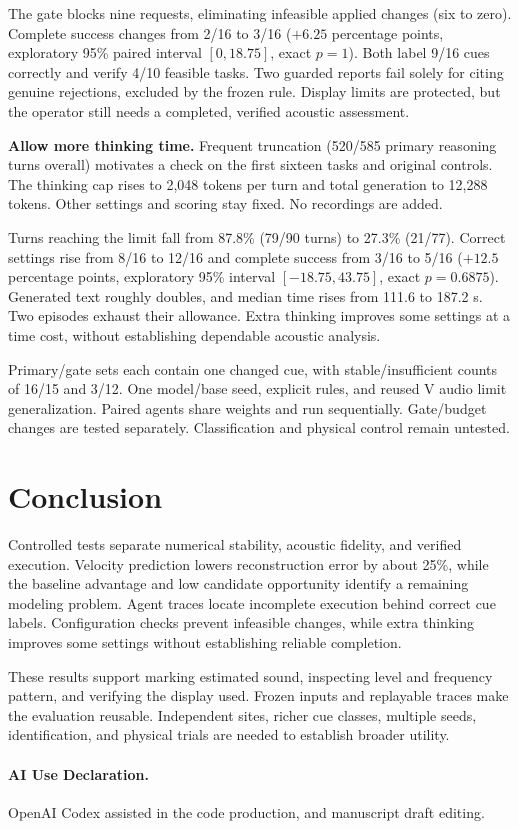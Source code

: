 \documentclass[runningheads,orivec]{llncs}
\begin{document}
The gate blocks nine requests, eliminating infeasible applied changes (six to zero). Complete success changes from 2/16 to 3/16 ($+6.25$ percentage points, exploratory 95\% paired interval $[0,18.75]$, exact $p=1$). Both label 9/16 cues correctly and verify 4/10 feasible tasks. Two guarded reports fail solely for citing genuine rejections, excluded by the frozen rule. Display limits are protected, but the operator still needs a completed, verified acoustic assessment.

\textbf{Allow more thinking time.} Frequent truncation (520/585 primary reasoning turns overall) motivates a check on the first sixteen tasks and original controls. The thinking cap rises to 2,048 tokens per turn and total generation to 12,288 tokens. Other settings and scoring stay fixed. No recordings are added.

Turns reaching the limit fall from 87.8\% (79/90 turns) to 27.3\% (21/77). Correct settings rise from 8/16 to 12/16 and complete success from 3/16 to 5/16 ($+12.5$ percentage points, exploratory 95\% interval $[-18.75,43.75]$, exact $p=0.6875$). Generated text roughly doubles, and median time rises from 111.6 to 187.2 s. Two episodes exhaust their allowance. Extra thinking improves some settings at a time cost, without establishing dependable acoustic analysis.

Primary/gate sets each contain one changed cue, with stable/insufficient counts of 16/15 and 3/12. One model/base seed, explicit rules, and reused V audio limit generalization. Paired agents share weights and run sequentially. Gate/budget changes are tested separately. Classification and physical control remain untested.

\section{Conclusion}

Controlled tests separate numerical stability, acoustic fidelity, and verified execution. Velocity prediction lowers reconstruction error by about 25\%, while the baseline advantage and low candidate opportunity identify a remaining modeling problem. Agent traces locate incomplete execution behind correct cue labels. Configuration checks prevent infeasible changes, while extra thinking improves some settings without establishing reliable completion.

These results support marking estimated sound, inspecting level and frequency pattern, and verifying the display used. Frozen inputs and replayable traces make the evaluation reusable. Independent sites, richer cue classes, multiple seeds, identification, and physical trials are needed to establish broader utility.

\clearpage
\paragraph{AI Use Declaration.} OpenAI Codex assisted in the code production, and manuscript draft editing.



\end{document}
